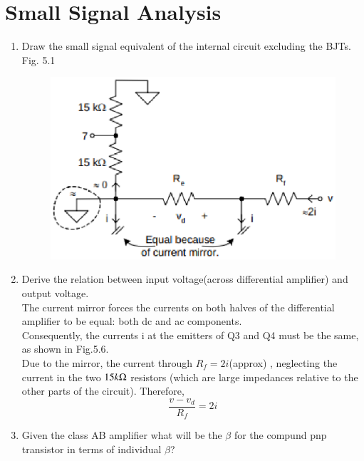 \documentclass[journal,12pt,twocolumn]{IEEEtran}
\renewcommand\thesection{\arabic{section}}
\begin{document}
\section{Small Signal Analysis}
\begin{enumerate}[label=\thesection.\arabic*,ref=\thesection.\theenumi]
\item Draw the small signal equivalent of the internal circuit excluding the BJTs.\\

\solution Fig. 5.1

\begin{figure}[!ht]
\centering
\includegraphics[width=0.7\columnwidth]{./figs/LM3866.eps}
\caption{}
\label{fig:2}
\end{figure}

\item Derive the relation between input voltage(across differential amplifier) and output voltage.\\
\solution
The current mirror forces the currents on both halves of the
differential amplifier to be equal: both dc and ac components.\\
Consequently, the currents i at the emitters of Q3 and Q4 must
be the same, as shown in Fig.5.6.\\ Due to the mirror, the current through $R_{f} = 2 i$(approx) , neglecting the current in the two $15k\ohm$ resistors (which are large impedances
relative to the other parts of the circuit). Therefore,\\
$$\frac{v-v_{d}}{R_{f}}=2i$$   

\item Given the class AB amplifier what will be the $\beta$ for the compund pnp transistor in terms of individual $\beta$?

\begin{figure}[!ht]
  \centering
 

\end{figure}
\end{enumerate}
\end{document}
